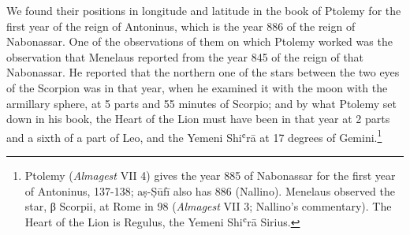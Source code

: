 \documentclass[11pt]{article}
\begin{document}
\par We found their positions in longitude and latitude in the book of Ptolemy for the first year of the reign of Antoninus, which is the year 886 of the reign of Nabonassar. One of the observations of them on which Ptolemy worked was the observation that Menelaus reported from the year 845 of the reign of that Nabonassar. He reported that the northern one of the stars between the two eyes of the Scorpion was in that year, when he examined it with the moon with the armillary sphere, at 5 parts and 55 minutes of Scorpio; and by what Ptolemy set down in his book, the Heart of the Lion must have been in that year at 2 parts and a sixth of a part of Leo, and the Yemeni Shiʿrā at 17 degrees of Gemini.\footnote{Ptolemy (\emph{Almagest} VII 4) gives the year 885 of Nabonassar for the first year of Antoninus, 137-138; aṣ-Ṣūfī also has 886 (Nallino). Menelaus observed the star, β Scorpii, at Rome in 98 (\emph{Almagest} VII 3; Nallino's commentary). The Heart of the Lion is Regulus, the Yemeni Shiʿrā Sirius.}\par
\end{document}
